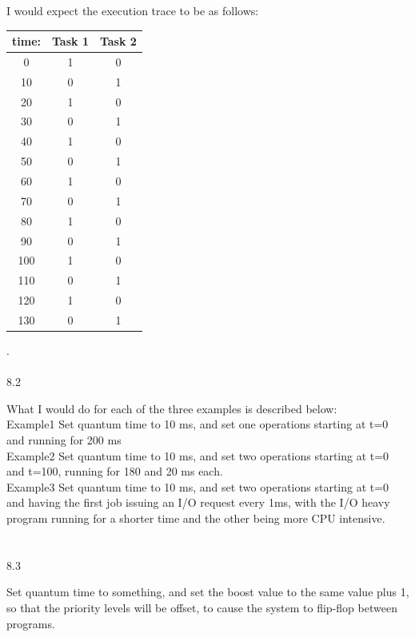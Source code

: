\documentclass[12pt, a4paper]{article}
\begin{document}
I would expect the execution trace to be as follows:

 \begin{center}
\begin{tabular}{ |c|c|c|} 
 \hline
 time:& Task 1 & Task 2 \\ 
 \hline
 0 & 1 & 0 \\ 
 10 & 0 & 1 \\
 20 & 1  & 0\\
 30 &0 &1 \\
 40 &1 &0\\
 50 & 0& 1\\
 60 & 1& 0\\
 70 & 0& 1\\
 80 & 1& 0\\
 90 & 0&1 \\
 100 &1 & 0\\
 110 & 0& 1\\
 120 &1 &0\\ 
 130 &0 &1 \\
 \hline
\end{tabular}
\end{center}
.\\ \\

8.2

What I would do for each of the three examples is described below: \\

Example1
Set quantum time to 10 ms, and set one operations starting at t=0 and running for 200 ms\\

Example2
Set quantum time to 10 ms, and set two operations starting at t=0 and t=100, running for 180 and 20 ms each.\\

Example3
Set quantum time to 10 ms, and set two operations starting at t=0 and having the first job issuing an I/O request every 1ms, with the I/O heavy program running for a shorter time and the other being more CPU intensive. \\ \\ \\

8.3

Set quantum time to something, and set the boost value to the same value plus 1, so that the priority levels will be offset, to cause the system to flip-flop between programs. \\ \\ \\
 
\end{document}
